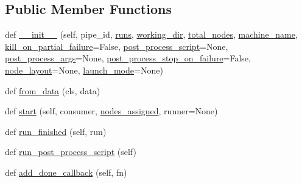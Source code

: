\subsection*{Public Member Functions}
\begin{DoxyCompactItemize}
\item 
def \hyperlink{classcodar_1_1savanna_1_1model_1_1_pipeline_ada8df2357966f7e3cc7c34d3ee36f9a1}{\+\_\+\+\_\+init\+\_\+\+\_\+} (self, pipe\+\_\+id, \hyperlink{classcodar_1_1savanna_1_1model_1_1_pipeline_aceeec7aae018e27934619f797162d458}{runs}, \hyperlink{classcodar_1_1savanna_1_1model_1_1_pipeline_a2272c691cd2ecb1b11b581341cd5707c}{working\+\_\+dir}, \hyperlink{classcodar_1_1savanna_1_1model_1_1_pipeline_ae5ea9a86523bdbbc9537a37b6d01436c}{total\+\_\+nodes}, \hyperlink{classcodar_1_1savanna_1_1model_1_1_pipeline_a7492ac83160febb20e9a60dad2a9233f}{machine\+\_\+name}, \hyperlink{classcodar_1_1savanna_1_1model_1_1_pipeline_a8f831647499af6eae5696a85abc9a449}{kill\+\_\+on\+\_\+partial\+\_\+failure}=False, \hyperlink{classcodar_1_1savanna_1_1model_1_1_pipeline_a5539114ad7bace8f9753064e3d4a28ec}{post\+\_\+process\+\_\+script}=None, \hyperlink{classcodar_1_1savanna_1_1model_1_1_pipeline_a4568a89046b0fc45c5e6f3f5d80588a1}{post\+\_\+process\+\_\+args}=None, \hyperlink{classcodar_1_1savanna_1_1model_1_1_pipeline_aed4a93e26e62b1878c277a6d9a992fa9}{post\+\_\+process\+\_\+stop\+\_\+on\+\_\+failure}=False, \hyperlink{classcodar_1_1savanna_1_1model_1_1_pipeline_a32c1000ef2bf29a77c0f7ca8849adb64}{node\+\_\+layout}=None, \hyperlink{classcodar_1_1savanna_1_1model_1_1_pipeline_a93c4ea2d9b1714d9f78aba21c1507e95}{launch\+\_\+mode}=None)
\item 
def \hyperlink{classcodar_1_1savanna_1_1model_1_1_pipeline_abf71facf9275710199941f0f79997db2}{from\+\_\+data} (cls, data)
\item 
def \hyperlink{classcodar_1_1savanna_1_1model_1_1_pipeline_ad7ddded563710c1a240b850c56a3fd3c}{start} (self, consumer, \hyperlink{classcodar_1_1savanna_1_1model_1_1_pipeline_ae821850c02f50972fa0edb2284ff9c59}{nodes\+\_\+assigned}, runner=None)
\item 
def \hyperlink{classcodar_1_1savanna_1_1model_1_1_pipeline_a0a7fe2d4e57a5604ae9d997caeee2f87}{run\+\_\+finished} (self, run)
\item 
def \hyperlink{classcodar_1_1savanna_1_1model_1_1_pipeline_a9a21933f3cc3457a161029b4f708997b}{run\+\_\+post\+\_\+process\+\_\+script} (self)
\item 
def \hyperlink{classcodar_1_1savanna_1_1model_1_1_pipeline_a05bcb6afe339fb967d8d358d5c6037ca}{add\+\_\+done\+\_\+callback} (self, fn)

\end{DoxyCompactItemize}
